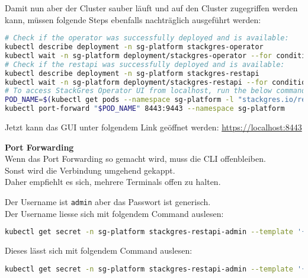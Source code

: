 Damit nun aber der Cluster sauber läuft und auf den Cluster zugegriffen werden kann, müssen folgende Steps ebenfalls nachträglich ausgeführt werden:
\lstset{style=gra_codestyle}
\begin{lstlisting}[language=bash, caption=StackGres-Citus - Post-Installation,captionpos=b,label={lst:stackgres_citus-post-installation},breaklines=true]
# Check if the operator was successfully deployed and is available:
kubectl describe deployment -n sg-platform stackgres-operator
kubectl wait -n sg-platform deployment/stackgres-operator --for condition=Available
# Check if the restapi was successfully deployed and is available:
kubectl describe deployment -n sg-platform stackgres-restapi
kubectl wait -n sg-platform deployment/stackgres-restapi --for condition=Available
# To access StackGres Operator UI from localhost, run the below commands:
POD_NAME=$(kubectl get pods --namespace sg-platform -l "stackgres.io/restapi=true" -o jsonpath="{.items[0].metadata.name}")
kubectl port-forward "$POD_NAME" 8443:9443 --namespace sg-platform
\end{lstlisting}
Jetzt kann das GUI unter folgendem Link geöffnet werden:
\url{https://localhost:8443}

\begin{warning}
  \textbf{Port Forwarding}\\
  Wenn das Port Forwarding so gemacht wird, muss die CLI offenbleiben.\\
  Sonst wird die Verbindung umgehend gekappt.\\
  Daher empfiehlt es sich, mehrere Terminals offen zu halten.
\end{warning}

Der Username ist \texttt{admin} aber das Passwort ist generisch.\\
Der Username liesse sich mit folgendem Command auslesen:
\lstset{style=gra_codestyle}
\begin{lstlisting}[language=bash, caption=StackGres-Citus - System Username,captionpos=b,label={lst:stackgres_citus-system-username},breaklines=true]
kubectl get secret -n sg-platform stackgres-restapi-admin --template '{{ printf "username = %s\n" (.data.k8sUsername | base64decode) }}'
\end{lstlisting}
Dieses lässt sich mit folgendem Command auslesen:
\lstset{style=gra_codestyle}
\begin{lstlisting}[language=bash, caption=StackGres-Citus - System Passwort,captionpos=b,label={lst:stackgres_citus-system-password},breaklines=true]
kubectl get secret -n sg-platform stackgres-restapi-admin --template '{{ printf "password = %s\n" (.data.clearPassword | base64decode) }}'
\end{lstlisting}

